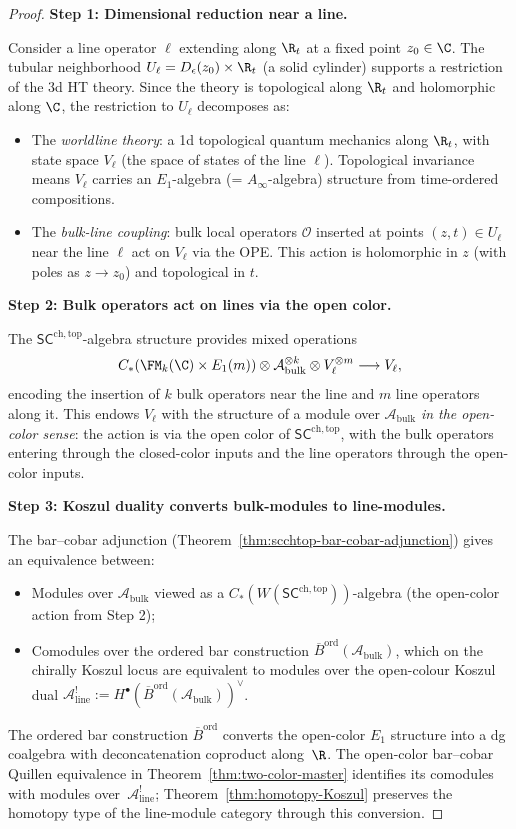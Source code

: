 \begin{proof}
\textbf{Step 1: Dimensional reduction near a line.}

Consider a line operator $\ell$ extending along $\R_t$ at a fixed point $z_0 \in \C$. The tubular neighborhood $U_\ell = D_\epsilon(z_0) \times \R_t$ (a solid cylinder) supports a restriction of the 3d HT theory. Since the theory is topological along $\R_t$ and holomorphic along $\C$, the restriction to $U_\ell$ decomposes as:
\begin{itemize}
\item The \emph{worldline theory}: a 1d topological quantum mechanics along $\R_t$, with state space $V_\ell$ (the space of states of the line $\ell$). Topological invariance means $V_\ell$ carries an $E_1$-algebra (= $A_\infty$-algebra) structure from time-ordered compositions.
\item The \emph{bulk-line coupling}: bulk local operators $\mathcal{O}$ inserted at points $(z, t) \in U_\ell$ near the line $\ell$ act on $V_\ell$ via the OPE. This action is holomorphic in $z$ (with poles as $z \to z_0$) and topological in $t$.
\end{itemize}

\textbf{Step 2: Bulk operators act on lines via the open color.}

The $\mathsf{SC}^{\mathrm{ch,top}}$-algebra structure provides mixed operations
\[
C_\ast(\FM_k(\C) \times E_1(m)) \otimes \mathcal{A}_{\mathrm{bulk}}^{\otimes k} \otimes V_\ell^{\otimes m} \longrightarrow V_\ell,
\]
encoding the insertion of $k$ bulk operators near the line and $m$ line operators along it. This endows $V_\ell$ with the structure of a module over $\mathcal{A}_{\mathrm{bulk}}$ \emph{in the open-color sense}: the action is via the open color of $\mathsf{SC}^{\mathrm{ch,top}}$, with the bulk operators entering through the closed-color inputs and the line operators through the open-color inputs.

\textbf{Step 3: Koszul duality converts bulk-modules to line-modules.}

The bar--cobar adjunction
(Theorem~\ref{thm:scchtop-bar-cobar-adjunction}) gives an equivalence
between:
\begin{itemize}
\item Modules over $\mathcal{A}_{\mathrm{bulk}}$ viewed as a
 $C_\ast(W(\mathsf{SC}^{\mathrm{ch,top}}))$-algebra (the open-color
 action from Step 2);
\item Comodules over the ordered bar construction
 $\overline{B}^{\mathrm{ord}}(\mathcal{A}_{\mathrm{bulk}})$, which on
 the chirally Koszul locus are equivalent to modules over the
 open-colour Koszul dual
 $\mathcal{A}^!_{\mathrm{line}} :=
 H^\bullet(\overline{B}^{\mathrm{ord}}(\mathcal{A}_{\mathrm{bulk}}))^\vee$.
\end{itemize}
The ordered bar construction $\overline{B}^{\mathrm{ord}}$ converts
the open-color $E_1$ structure into a dg coalgebra with
deconcatenation coproduct along~$\R$. The open-color bar--cobar
Quillen equivalence in Theorem~\ref{thm:two-color-master} identifies
its comodules with modules over~$\mathcal{A}^!_{\mathrm{line}}$;
Theorem~\ref{thm:homotopy-Koszul} preserves the homotopy type of the
line-module category through this conversion.


\end{proof}
